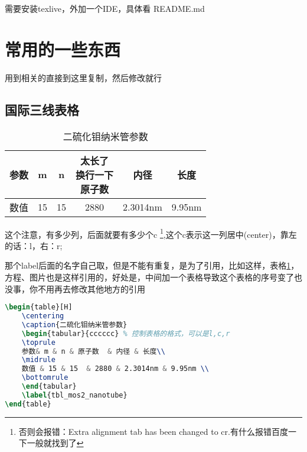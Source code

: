 \documentclass[AutoFakeBold]{LZUThesis}
\begin{document}
需要安装texlive，外加一个IDE，具体看 README.md


\section{常用的一些东西}
\label{sec:常用的一些东西}

用到相关的直接到这里复制，然后修改就行

\subsection{国际三线表格}
\label{sub:国际三线表格}

\begin{table}[H]
    \centering
    \caption{二硫化钼纳米管参数}
    \begin{tabular}{cccccc} %
        \toprule
        参数 & m  & n  & \tabincell{c}{太长了                     \\换行一下\\原子数}  & 内径 & 长度\\
        \midrule
        数值 & 15 & 15 & 2880              & 2.3014nm & 9.95nm \\
        \bottomrule
    \end{tabular}
    \label{tbl_mos2_nanotube}
\end{table}

这个注意，有多少列，后面就要有多少个c \footnote{否则会报错：Extra alignment tab has been changed to cr.有什么报错百度一下一般就找到了},这个c表示这一列居中(center)，靠左的话：l，右：r;

那个label后面的名字自己取，但是不能有重复，是为了引用，比如这样，表格\ref{tbl_mos2_nanotube}，方程、图片也是这样引用的，好处是，中间加一个表格导致这个表格的序号变了也没事，你不用再去修改其他地方的引用

\begin{lstlisting}[language = tex]
\begin{table}[H]
    \centering
    \caption{二硫化钼纳米管参数}
    \begin{tabular}{cccccc} % 控制表格的格式，可以是l,c,r
    \toprule
    参数& m & n & 原子数  & 内径 & 长度\\
    \midrule
    数值 & 15 & 15  & 2880 & 2.3014nm & 9.95nm \\
    \bottomrule
    \end{tabular}
    \label{tbl_mos2_nanotube}
\end{table}
\end{lstlisting}
\end{document}
